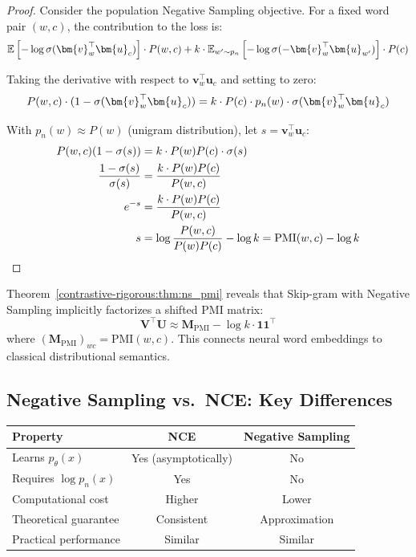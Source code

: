 \begin{notechapter}
\begin{proof}
Consider the population Negative Sampling objective. For a fixed word pair $(w, c)$, the contribution to the loss is:
\begin{equation}
\E\left[-\log \sigmoid(\bm{v}_w^\top \bm{u}_c)\right] \cdot P(w, c) + k \cdot \E_{w' \sim p_n}\left[-\log \sigmoid(-\bm{v}_w^\top \bm{u}_{w'})\right] \cdot P(c)
\end{equation}

Taking the derivative with respect to $\bm{v}_w^\top \bm{u}_c$ and setting to zero:
\begin{equation}
P(w, c) \cdot (1 - \sigmoid(\bm{v}_w^\top \bm{u}_c)) = k \cdot P(c) \cdot p_n(w) \cdot \sigmoid(\bm{v}_w^\top \bm{u}_c)
\end{equation}

With $p_n(w) \approx P(w)$ (unigram distribution), let $s = \bm{v}_w^\top \bm{u}_c$:
\begin{align}
P(w, c)(1 - \sigma(s)) &= k \cdot P(w) P(c) \cdot \sigma(s) \\
\frac{1 - \sigma(s)}{\sigma(s)} &= \frac{k \cdot P(w) P(c)}{P(w, c)} \\
e^{-s} &= \frac{k \cdot P(w) P(c)}{P(w, c)} \\
s &= \log \frac{P(w, c)}{P(w) P(c)} - \log k = \text{PMI}(w, c) - \log k
\end{align}
\end{proof}

\begin{keyresult}
Theorem~\ref{contrastive-rigorous:thm:ns_pmi} reveals that Skip-gram with Negative Sampling implicitly factorizes a shifted PMI matrix:
\begin{equation}
\bm{V}^\top \bm{U} \approx \bm{M}_{\text{PMI}} - \log k \cdot \bm{1}\bm{1}^\top
\end{equation}
where $(\bm{M}_{\text{PMI}})_{wc} = \text{PMI}(w, c)$. This connects neural word embeddings to classical distributional semantics.
\end{keyresult}

\subsection{Negative Sampling vs.\ NCE: Key Differences}

\begin{center}
\begin{tabular}{lcc}
\toprule
\textbf{Property} & \textbf{NCE} & \textbf{Negative Sampling} \\
\midrule
Learns $p_\theta(x)$ & Yes (asymptotically) & No \\
Requires $\log p_n(x)$ & Yes & No \\
Computational cost & Higher & Lower \\
Theoretical guarantee & Consistent & Approximation \\
Practical performance & Similar & Similar \\
\bottomrule
\end{tabular}
\end{center}


\end{notechapter}
